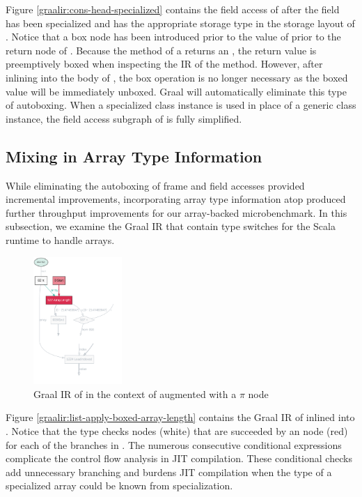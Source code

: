 Figure \ref{graalir:cons-head-specialized} contains the field access of  after the field has been specialized and has the appropriate storage type in the storage layout of .
Notice that a box node has been introduced prior to the value of  prior to the return node of .
Because the  method of a  returns an , the return value is preemptively boxed when inspecting the IR of the method.
However, after inlining into the body of , the box operation is no longer necessary as the boxed value will be immediately unboxed.
Graal will automatically eliminate this type of autoboxing.
When a specialized class instance is used in place of a generic class instance, the field access subgraph of  is fully simplified.

\subsection{Mixing in Array Type Information}

While eliminating the autoboxing of frame and field accesses provided incremental improvements, incorporating array type information atop produced further throughput improvements for our array-backed microbenchmark.
In this subsection, we examine the Graal IR that contain type switches for the Scala runtime to handle arrays.

\begin{figure}[!htb]
	\centering
	\includegraphics[width=0.3\textwidth]{figures/dot/List.apply.specialized.array_length.png}
	\caption{Graal IR of  in the context of  augmented with a $\pi$ node}
	\label{graalir:list-apply-specialized-array-length}
\end{figure}

Figure \ref{graalir:list-apply-boxed-array-length} contains the Graal IR of  inlined into . 
Notice that the  type checks nodes (white) that are succeeded by an  node (red) for each of the branches in .
The numerous consecutive conditional expressions complicate the control flow analysis in JIT compilation.
These conditional checks add unnecessary branching and burdens JIT compilation when the type of a specialized array could be known from specialization.

